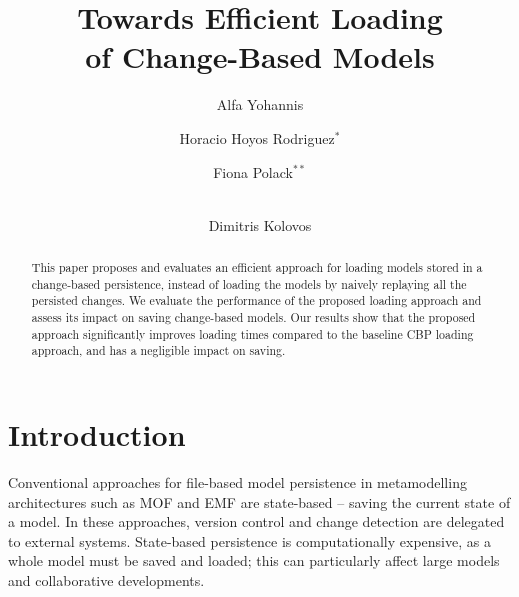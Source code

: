 \documentclass{llncs}
\begin{document}
\renewcommand{\thelstlisting}{\arabic{lstlisting}}
\renewcommand{\labelitemi}{$\bullet$}
\newcommand{\dk}[1]{\textbf{[DK: #1]}}

\title{Towards Efficient Loading \\ of Change-Based Models}
%
%
\author{
Alfa Yohannis \and Horacio Hoyos Rodriguez$^{*}$ \and Fiona Polack$^{**}$ \and \\ Dimitris Kolovos
}
%
%
%


\maketitle      %
\begin{abstract}
This paper proposes and evaluates an efficient approach for loading models stored in a change-based persistence, instead of loading the models by naively replaying all the persisted changes. We evaluate the performance of the proposed loading approach and assess its impact on saving change-based models. Our results show that the proposed approach significantly improves loading times compared to the baseline CBP loading approach, and has a negligible impact on saving.

\end{abstract}

\section{Introduction}
\label{sec:introduction}
Conventional approaches for file-based model persistence in metamodelling architectures such as MOF \cite{omg2018mof} and EMF \cite{steinberg2008emf} are state-based -- saving the current state of a model.  In these approaches,  version control and change detection are delegated to external systems.  State-based persistence is computationally expensive, as a whole model must be saved and loaded; this can particularly affect large models and collaborative developments.
\end{document}
